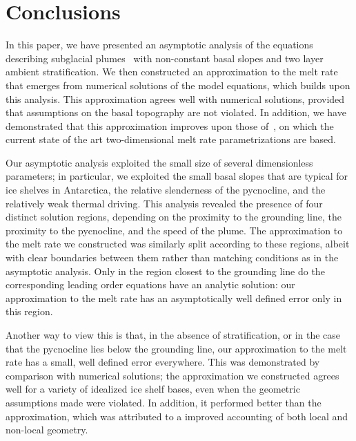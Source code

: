 \documentclass{jfm}
\begin{document}
\section{Conclusions}\label{S:Discussion}
In this paper, we have presented an asymptotic analysis of the equations describing subglacial plumes~\cite{Jenkins1991JGeophysResOceans, Jenkins2011JPhysOcean} with non-constant basal slopes and two layer ambient stratification. We then constructed an approximation to the melt rate that emerges from numerical solutions of the model equations, which builds upon this analysis. This approximation agrees well with numerical solutions, provided that assumptions on the basal topography are not violated. In addition, we have demonstrated that this approximation improves upon those of~\citet{Lazeroms2019JPhysOcean}, on which the current state of the art two-dimensional melt rate parametrizations are based.

Our asymptotic analysis exploited the small size of several dimensionless parameters; in particular, we exploited the small  basal slopes that are typical for ice shelves in Antarctica, the relative slenderness of the pycnocline, and the relatively weak thermal driving. This analysis revealed the presence of four distinct solution regions, depending on the proximity to the grounding line, the proximity to the pycnocline, and the speed of the plume. The approximation to the melt rate we constructed was similarly split according to these regions, albeit with clear boundaries between them rather than matching conditions as in the asymptotic analysis. Only in the region closest to the grounding line do the corresponding leading order equations have an analytic solution: our approximation to the melt rate has an asymptotically well defined error only in this region. 

Another way to view this is that, in the absence of stratification, or in the case that the pycnocline lies below the grounding line, our approximation to the melt rate has a small, well defined error everywhere.  This was demonstrated by comparison with numerical solutions; the approximation we constructed agrees well for a variety of idealized ice shelf bases, even when the geometric assumptions made were violated. In addition, it performed better than the ~\citet{Lazeroms2019JPhysOcean} approximation, which was attributed to a improved accounting of both local and non-local geometry.
\end{document}
